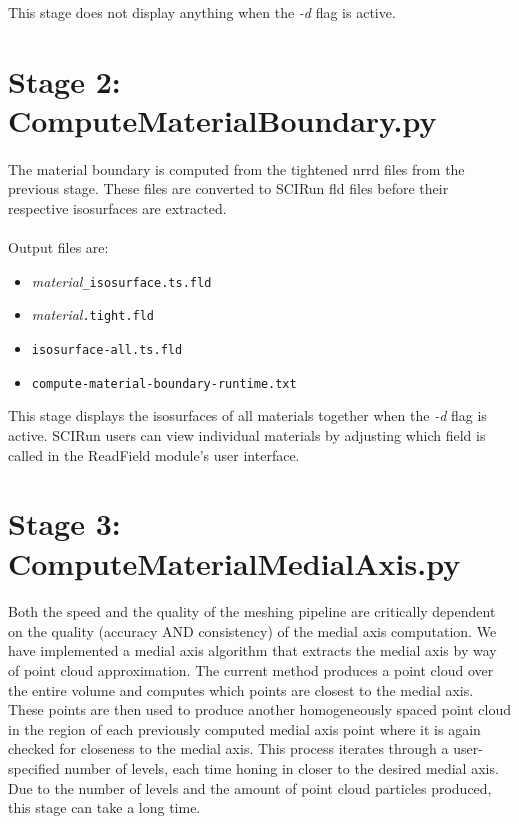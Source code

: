 \documentclass[fleqn,12pt,openany]{book}
\begin{document}
This stage does not display anything when the \emph{-d} flag is active.

\section{Stage 2: ComputeMaterialBoundary.py}

\paragraph{}
The material boundary is computed from the tightened nrrd files from the previous 
stage.
These files are converted to SCIRun fld files before their respective isosurfaces are extracted. \\ \\

Output files are:
\begin{itemize}

\item{\emph{material}\verb+_isosurface.ts.fld+}
\item{\emph{material}\verb+.tight.fld+}
\item{\verb+isosurface-all.ts.fld+}
\item{\verb+compute-material-boundary-runtime.txt+}

\end{itemize}

This stage displays the isosurfaces of all materials together when the \emph{-d} 
flag is active.  SCIRun users can view individual materials by adjusting which 
field is called in the ReadField module's user interface.

\section{Stage 3: ComputeMaterialMedialAxis.py}

\paragraph{}
Both the speed and the quality of the meshing pipeline are critically dependent 
on the quality (accuracy AND consistency) of the medial axis computation.  We 
have implemented a medial axis algorithm that extracts the medial axis by way 
of point cloud approximation.  The current method produces a point cloud over 
the entire volume and computes which points are closest to the medial axis.  
These points are then used to produce another homogeneously spaced point cloud 
in the region of each previously computed medial axis point where it is again 
checked for closeness to the medial axis.  This process iterates through a user-specified number of  
levels, each time honing in closer to the desired medial axis.  Due to the 
number of levels and the amount of point cloud particles produced, this stage 
can take a long time.  \\ \\
\end{document}
